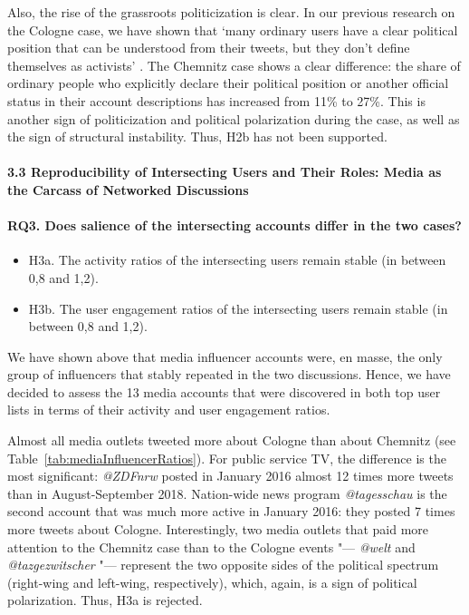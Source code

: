 Also, the rise of the grassroots politicization is clear. In our previous research on the Cologne case, we have shown that ‘many ordinary users have a clear political position that can be understood from their tweets, but they don’t define themselves as activists’ \cite[p.~141]{SmoliarovaBodrunovaBlekanov}. The Chemnitz case shows a clear difference: the share of ordinary people who explicitly declare their political position or another official status in their account descriptions has increased from 11\% to 27\%. This is another sign of politicization and political polarization during the case, as well as the sign of structural instability. Thus, H2b has not been supported.

\paragraph{3.3 Reproducibility of Intersecting Users and Their Roles: Media as the Carcass of Networked Discussions}

\paragraph{RQ3. Does salience of the intersecting accounts differ in the two cases?}

\begin{itemize}
	\item H3a. The activity ratios of the intersecting users remain stable (in between 0,8 and 1,2).
	\item H3b. The user engagement ratios of the intersecting users remain stable (in between 0,8 and 1,2).
\end{itemize}

We have shown above that media influencer accounts were, en masse, the only group of influencers that stably repeated in the two discussions. Hence, we have decided to assess the 13 media accounts that were discovered in both top user lists in terms of their activity and user engagement ratios.

Almost all media outlets tweeted more about Cologne than about Chemnitz (see Table~\cref{tab:mediaInfluencerRatios}). For public service TV, the difference is the most significant: \textit{@ZDFnrw} posted in January 2016 almost 12 times more tweets than in August-September 2018. Nation-wide news program \textit{@tagesschau} is the second account that was much more active in January 2016: they posted 7 times more tweets about Cologne. Interestingly, two media outlets that paid more attention to the Chemnitz case than to the Cologne events "--- \textit{@welt} and \textit{@tazgezwitscher} "--- represent the two opposite sides of the political spectrum (right-wing and left-wing, respectively), which, again, is a sign of political polarization. Thus, H3a is rejected.

